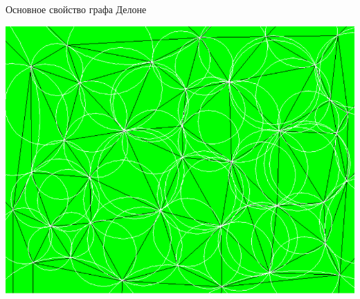 \documentclass[14pt, fleqn, xcolor={dvipsnames, table}]{beamer}
\begin{document}
        \begin{frame}{Основное свойство графа Делоне}
            \begin{center}
	            \includegraphics[scale = 0.33]{voronoi-4.png}
	        \end{center}       
        \end{frame}
        
\end{document}
